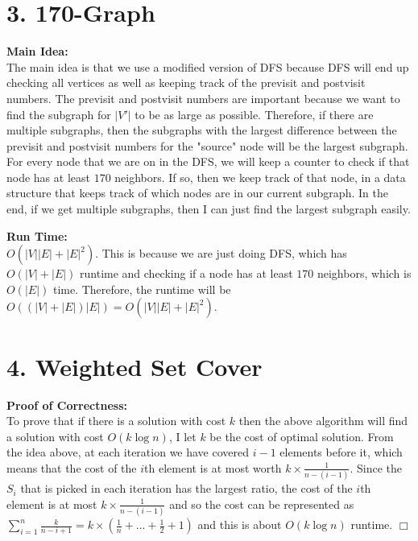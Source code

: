 \documentclass[11pt]{article}
\def\endproofmark{$\Box$}
\newenvironment{mainIdea}{\par{\bf Main Idea:}}{\smallskip}
\newenvironment{proofOfCorrectness}{\par{\bf Proof of Correctness:}}{\endproofmark\smallskip}
\newenvironment{runTime}{\par{\bf Run Time:}}{\smallskip}
\begin{document}
\section*{3. 170-Graph}
\begin{mainIdea}
\\
The main idea is that we use a modified version of DFS because DFS will end up checking all vertices as well as keeping track of the previsit and postvisit numbers. The previsit and postvisit numbers are important because we want to find the subgraph for $|V'|$ to be as large as possible. Therefore, if there are multiple subgraphs, then the subgraphs with the largest difference between the previsit and postvisit numbers for the "source" node will be the largest subgraph. For every node that we are on in the DFS, we will keep a counter to check if that node has at least $170$ neighbors. If so, then we keep track of that node, in a data structure that keeps track of which nodes are in our current subgraph. In the end, if we get multiple subgraphs, then I can just find the largest subgraph easily.
\end{mainIdea}
\\
\begin{runTime}
\\
$O(|V||E| + |E| ^ 2)$. This is because we are just doing DFS, which has $O(|V| + |E|)$ runtime and checking if a node has at least $170$ neighbors, which is $O(|E|)$ time. Therefore, the runtime will be $O((|V| + |E|) |E|) = O(|V||E| + |E| ^ 2)$.
\end{runTime}



\newpage
\section*{4. Weighted Set Cover}
\begin{proofOfCorrectness}
\\
To prove that if there is a solution with cost $k$ then the above algorithm will find a solution with cost $O(k \log{n})$, I let $k$ be the cost of optimal solution. From the idea above, at each iteration we have covered $i - 1$ elements before it, which means that the cost of the $i$th element is at most worth $k \times \frac{1} {n - (i - 1)}$. Since the $S_i$ that is picked in each iteration has the largest ratio, the cost of the $i$th element is at most $k \times \frac{1} {n - (i - 1)}$ and so the cost can be represented as $\sum_{i = 1}^{n} \frac{k} {n - i + 1} = k \times \left(\frac{1} {n} + ... + \frac{1} {2} + 1\right)$ and this is about $O(k \log{n})$ runtime.
\end{proofOfCorrectness}
\end{document}
